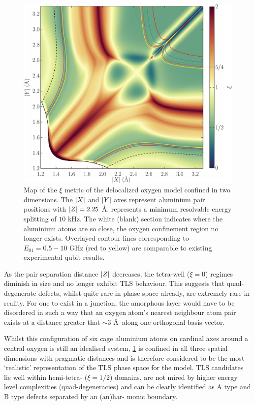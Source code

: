 \begin{figure}[htp]
  \includegraphics[width=\textwidth]{figures/xi225}
  \caption[$\xi$ Metric Phase Map, With $\abs{Z} = 2.25$ \AA]{\label{fig:xi225}Map of the $\xi$ metric of the delocalized oxygen model confined in two dimensions. The $\lvert X\rvert$ and $\lvert Y\rvert$ axes represent aluminium pair positions with $\abs{Z} = 2.25$ \AA.  represents a minimum resolvable energy splitting of $10$ kHz. The white (blank) section indicates where the aluminium atoms are so close, the oxygen confinement region no longer exists. Overlayed contour lines corresponding to $E_{01} = 0.5\!-\!10$ GHz (red to yellow) are comparable to existing experimental qubit results.}
\end{figure}

As the pair separation distance $\lvert Z\rvert$ decreases, the tetra-well ($\xi=0$) regimes diminish in size and no longer exhibit TLS behaviour.
This suggests that quad-degenerate defects, whilst quite rare in phase space already, are extremely rare in reality.
For one to exist in a junction, the amorphous layer would have to be disordered in such a way that an oxygen atom's nearest neighbour atom pair exists at a distance greater that $\sim 3$ \AA\ along one orthogonal basis vector.

Whilst this configuration of six cage aluminium atoms on cardinal axes around a central oxygen is still an idealised system, \cref{fig:xi225} is confined in all three spatial dimensions with pragmatic distances and is therefore considered to be the most `realistic' representation of the TLS phase space for the  model.
TLS candidates lie well within hemi-tetra- ($\xi=1/2$) domains, are not mired by higher energy level complexities (\ie quad-degeneracies) and can be clearly identified as A type and B type defects separated by an (an)har- monic boundary.

